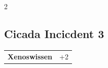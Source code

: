 \begin{multicols}{2}
\begin{tcolorbox}

\end{tcolorbox}

\begin{tcolorbox}
    \subsection*{Cicada Incicdent \hfill \small{3 }}
    \tcblower




\begin{tabular}{@{}ll@{}}
    \textbf{Xenoswissen} & +2\\
\end{tabular}


\end{tcolorbox}

\end{multicols}